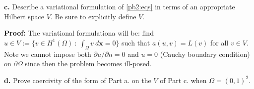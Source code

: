 \documentclass[11pt]{article}
\begin{document}
\vskip 2cm




\textbf{c.} Describe a variational formulation of \eqref{pb2:eqs} in terms of an appropriate Hilbert space $V$. Be sure to explicitly define $V$.


\vskip 1cm


\textbf{Proof:} The variational formulationa will be: find $u \in V:= \{ v \in H^1(\Omega) \: : \: \int_\Omega v \: d\boldsymbol{x} = 0 \}$ such that $a(u,v) = L(v)$ for all $v \in V$.
Note we cannot impose both $\partial u/ \partial n = 0$ and $u = 0$ (Cauchy boundary condition) on $\partial \Omega$ since then the problem becomes ill-posed.

\vskip 2cm


\textbf{d.} Prove coercivity of the form of Part a. on the $V$ of Part c. when $\Omega = (0,1)^2$.



\vskip 1cm
\end{document}
